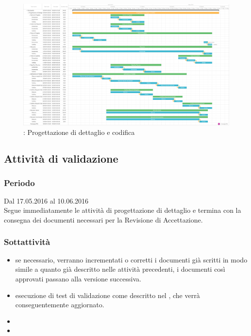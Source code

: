 \documentclass[a4paper, titlepage]{article}
\begin{document}
	\newpage
	\begin{figure}[!ht]
		\includegraphics[scale=0.25]{Img/Grafici_Gantt/Progettazione(dett-cod).pdf}
		\caption{ : Progettazione di dettaglio e codifica}
	\end{figure}
	
	\subsection{Attività di validazione}
	\subsubsection{Periodo}
	Dal 17.05.2016 al 10.06.2016\\
	Segue immediatamente le attività di progettazione di dettaglio  e termina con la consegna dei documenti necessari per la Revisione di Accettazione.
	
	\subsubsection{Sottattività}
	\begin{itemize}
		\item {} se necessario, verranno incrementati o corretti i documenti già scritti in modo simile a quanto già descritto nelle attività precedenti, i documenti così approvati passano alla versione successiva.
		\item {} esecuzione di test di validazione come descritto nel , che verrà conseguentemente aggiornato.
		\item {} 
		\item {} 
	\end{itemize}
	
\end{document}

